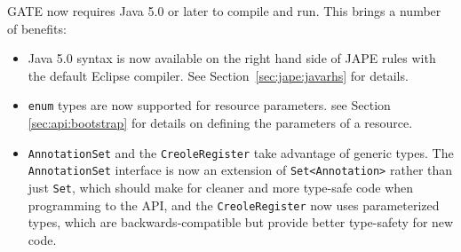 GATE now requires Java 5.0 or later to compile and run.
This brings a number of benefits:
\begin{itemize}
\item Java 5.0 syntax is now available on the right hand side of JAPE rules
  with the default Eclipse compiler.  See
  Section~\ref{sec:jape:javarhs} for details.
\item \texttt{enum} types are now supported for resource parameters.  see
  Section \ref{sec:api:bootstrap} for details on defining the parameters
  of a resource.
\item \texttt{AnnotationSet} and the \texttt{CreoleRegister} take advantage of
  generic types.  The \texttt{AnnotationSet} interface is now an extension of
  \texttt{Set<Annotation>} rather than just \texttt{Set}, which should make for
  cleaner and more type-safe code when programming to the API, and the
  \texttt{CreoleRegister} now uses parameterized types, which are
  backwards-compatible but provide better type-safety for new code.
\end{itemize}

